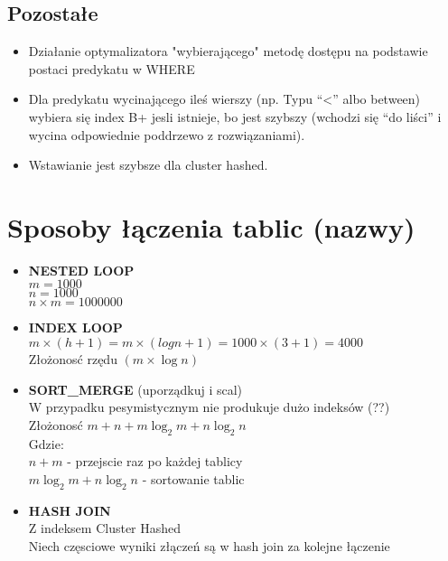 \documentclass[a4paper,twoside]{article}
\begin{document}
  	\subsection*{Pozostałe}
  	\begin{itemize}
  		\item Działanie optymalizatora "wybierającego" metodę dostępu na podstawie postaci predykatu w WHERE
  		\item Dla predykatu wycinającego ileś wierszy (np. Typu “<” albo between) wybiera się index B+ jesli istnieje, bo jest szybszy (wchodzi się “do liści” i wycina odpowiednie poddrzewo z rozwiązaniami).
  		\item Wstawianie jest szybsze dla cluster hashed.
  	\end{itemize}
  	
  	\section*{Sposoby łączenia tablic (nazwy)}
  	\begin{itemize}
  		\item \textbf{NESTED LOOP}\\
  		\(m=1000\)\\\(n=1000\)\\\(n\times{m}=1000000\)
  		\item \textbf{INDEX LOOP}\\
  		\(m\times({h}+1)=m\times{(logn+1)}=1000\times{(3+1)}=4000\)\\
  		Złożonosć rzędu \((m\times\log{n})\)
  		\item \textbf{SORT\_MERGE} (uporządkuj i scal)\\
  		W przypadku pesymistycznym nie produkuje dużo indeksów (??)\\
  		Złożonosć \(m+n+m\log_2 m+n\log_2 n\)\\
  		Gdzie:\\
  		\(n+m\) - przejscie raz po każdej tablicy\\
  		\(m\log_2 m+n\log_2 n\) - sortowanie tablic
  		\item \textbf{HASH JOIN}\\
  		Z indeksem Cluster Hashed\\
  		Niech częsciowe wyniki złączeń są w hash join za kolejne łączenie
  	\end{itemize}
  	
\end{document}
